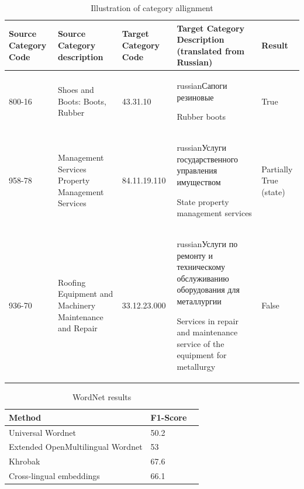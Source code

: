 \documentclass[11pt,a4paper]{article}
\begin{document}
\begin{center}
	\begin{table}
		\label{table-annotation}		
		\small
		\centering
		\caption{Illustration of category allignment}
		\begin{tabular}{|p{2cm}|p{4cm}|p{2cm}|p{4cm}|p{1cm}|}
			\hline			
			{Source Category Code} & {Source Category description}& {Target Category Code} & {Target Category Description (translated from Russian)} & {Result}\\
			\hline
			{800-16} & {Shoes and Boots: Boots, Rubber} &
			{43.31.10} & {\begin{otherlanguage*}{russian}Сапоги резиновые\end{otherlanguage*} \newline Rubber boots} &
			{True}
			\\
			\hline
			958-78 & Management Services Property Management Services &
			{84.11.19.110} & \begin{otherlanguage*}{russian}Услуги государственного управления имуществом\end{otherlanguage*} \newline State property management services &
			Partially True (state)
			\\
			\hline
			936-70 & {Roofing Equipment and Machinery Maintenance and Repair} &
			{33.12.23.000} & \begin{otherlanguage*}{russian}Услуги по ремонту и техническому обслуживанию оборудования для металлургии
			\end{otherlanguage*} \newline Services in repair and maintenance service of the equipment for metallurgy &
			False 
			\\
			\hline
			
			
		\end{tabular}
	\end{table}
\end{center}

\begin{table}[ht]
	\small
	\caption{WordNet results}
	\label{table-wordnet-results}		
	\begin{tabular}{|l|l|l|}
		
		\hline
		{Method} & {F1-Score} \\ \hline
		Universal Wordnet & 50.2 \\ \hline
		Extended OpenMultilingual Wordnet & 53 \\ \hline
		Khrobak & 67.6 \\ \hline
		Cross-lingual embeddings & 66.1 \\
		\hline
	\end{tabular}
\end{table}
\end{document}
